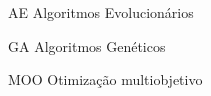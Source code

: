 \begin{siglas}
    \item[AE] Algoritmos Evolucionários
    \item[GA] Algoritmos Genéticos
    \item[MOO] Otimização multiobjetivo
\end{siglas}
